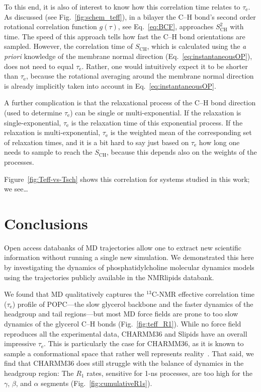\documentclass[journal=jpcbfk,manuscript=article,layout=twocolumn]{achemso}
\begin{document}
To this end, it is also of interest to know
how this correlation time relates to $\tau_\mathrm{e}$.
%
As discussed (see Fig.~\ref{fig:schem_teff}), 
in a bilayer the C--H bond's
second order rotational correlation function $g(\tau)$, see Eq.~\eqref{eq:BCF}, approaches $S^2_\mathrm{CH}$ with time. The speed of this approach tells how fast the C--H bond orientations are sampled.
%
However, the correlation time of $S_\mathrm{CH}$,
which is calculated using the {\it a priori} knowledge of the membrane normal direction (Eq.~\eqref{eq:instantaneousOP}),
does not need to equal $\tau_\mathrm e$.
Rather, one would intuitively expect it to be shorter than $\tau_\mathrm e$,
because the rotational averaging around the membrane normal direction is already implicitly taken into account in Eq.~\eqref{eq:instantaneousOP}.

A further complication is that the relaxational process of the C--H bond direction (used to determine $\tau_\mathrm e$) can be single or multi-exponential.
If the relaxation is single-exponential, $\tau_\mathrm e$ is the relaxation time of this exponential process. If the relaxation is multi-exponential, $\tau_\mathrm e$ is the weighted mean of the corresponding set of relaxation times, and it is a bit hard to say just based on $\tau_\mathrm e$ how long one needs to sample to reach the $S_\mathrm{CH}$, because this depends also on the weights of the processes.

Figure~\ref{fig:Teff-vs-Tsch} shows this correlation for systems studied in this work; we see\ldots
{}

\section{Conclusions}
Open access databanks of MD trajectories allow one to extract new scientific information without running a single new simulation.
We demonstrated this here by investigating the dynamics of phosphatidylcholine molecular dynamics models using  the trajectories publicly available in the NMRlipids databank.

We found that MD qualitatively captures the $^{13}$C-NMR effective correlation time ($\tau_\mathrm e$) profile of POPC---the slow glycerol backbone and the faster dynamics of the headgroup and tail regions---but most MD force fields are prone to too slow dynamics of the glycerol C--H bonds (Fig.~\ref{fig:teff_R1}).
%
While no force field reproduces all the experimental data,
CHARMM36 and Slipids have an overall impressive $\tau_\mathrm e$.
This is particularly the case for CHARMM36, as it is known to
sample a conformational space that rather well represents reality~\cite{botan15}.
%
That said, we find that CHARMM36 does still struggle with the balance of dynamics in the headgroup region:
The $R_1$ rates, sensitive for 1-ns processes, are too high for the $\gamma$, $\beta$, and $\alpha$ segments (Fig.~\ref{fig:cumulativeR1s}).
\end{document}
